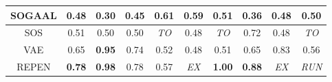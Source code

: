 \begin{table*}[!t]
\begin{center}
\begin{small}
\begin{tabular}{|c|c|c|c|c|c|c|c|c|c|}
        SOGAAL &                0.48 &             0.30 &            0.45 &           0.61 &           0.59 &          0.51 &                0.36 &            0.48 &           0.50 \\
\hline
                SOS &                0.51 &             0.50 &            0.50 &    \textit{TO} &           0.48 &   \textit{TO} &                0.72 &            0.48 &    \textit{TO} \\
\hline
                VAE &                0.65 &    \textbf{0.95} &            0.74 &           0.52 &           0.48 &          0.51 &                0.65 &            0.83 &           0.56 \\
\hline
REPEN & \textbf{0.78} & \textbf{0.98} & 0.78 & 0.57 & \textit{EX} & \textbf{1.00} & \textbf{0.88} & \textit{EX} & \textit{RUN} \\
\hline


\end{tabular}
\end{small}
\end{center}
\end{table*}
